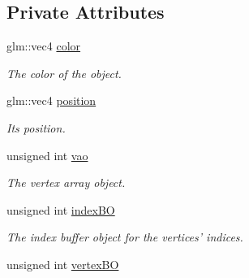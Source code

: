 \subsection*{Private Attributes}
\begin{DoxyCompactItemize}
\item 
\hypertarget{class_utility_1_1_basic_mesh_generation_1_1_circle_a0584a28154278a523d7a6f5f279cdbd5}{glm\-::vec4 \hyperlink{class_utility_1_1_basic_mesh_generation_1_1_circle_a0584a28154278a523d7a6f5f279cdbd5}{color}}\label{class_utility_1_1_basic_mesh_generation_1_1_circle_a0584a28154278a523d7a6f5f279cdbd5}

\begin{DoxyCompactList}\small\item\em The color of the object. \end{DoxyCompactList}\item 
\hypertarget{class_utility_1_1_basic_mesh_generation_1_1_circle_a70517725f0ea6c71d7ef95665854037a}{glm\-::vec4 \hyperlink{class_utility_1_1_basic_mesh_generation_1_1_circle_a70517725f0ea6c71d7ef95665854037a}{position}}\label{class_utility_1_1_basic_mesh_generation_1_1_circle_a70517725f0ea6c71d7ef95665854037a}

\begin{DoxyCompactList}\small\item\em Its position. \end{DoxyCompactList}\item 
\hypertarget{class_utility_1_1_basic_mesh_generation_1_1_circle_a3c4df53414fede5ba1c30296490f7fff}{unsigned int \hyperlink{class_utility_1_1_basic_mesh_generation_1_1_circle_a3c4df53414fede5ba1c30296490f7fff}{vao}}\label{class_utility_1_1_basic_mesh_generation_1_1_circle_a3c4df53414fede5ba1c30296490f7fff}

\begin{DoxyCompactList}\small\item\em The vertex array object. \end{DoxyCompactList}\item 
\hypertarget{class_utility_1_1_basic_mesh_generation_1_1_circle_a87cb7efa73e22776333c6f4e7144ee1e}{unsigned int \hyperlink{class_utility_1_1_basic_mesh_generation_1_1_circle_a87cb7efa73e22776333c6f4e7144ee1e}{index\-B\-O}}\label{class_utility_1_1_basic_mesh_generation_1_1_circle_a87cb7efa73e22776333c6f4e7144ee1e}

\begin{DoxyCompactList}\small\item\em The index buffer object for the vertices' indices. \end{DoxyCompactList}\item 
\hypertarget{class_utility_1_1_basic_mesh_generation_1_1_circle_a392f340df97712eae657d9eec1727451}{unsigned int \hyperlink{class_utility_1_1_basic_mesh_generation_1_1_circle_a392f340df97712eae657d9eec1727451}{vertex\-B\-O}}\label{class_utility_1_1_basic_mesh_generation_1_1_circle_a392f340df97712eae657d9eec1727451}


\end{DoxyCompactItemize}
